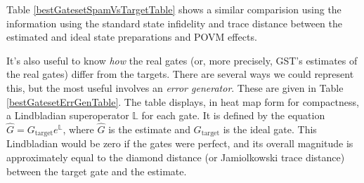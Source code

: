 \documentclass{article}[11pt]
\begin{document}
Table \ref{bestGatesetSpamVsTargetTable} shows a similar comparision using the information using the standard state infidelity and trace distance between the estimated and ideal state preparations and POVM effects.

It's also useful to know \emph{how} the real gates (or, more precisely, GST's estimates of the real gates) differ from the targets.  There are several ways we could represent this, but the most useful involves an \emph{error generator}.  These are given in Table \ref{bestGatesetErrGenTable}.  The table displays, in heat map form for compactness, a Lindbladian superoperator $\mathbb{L}$ for each gate.  It is defined by the equation $\hat{G} = G_{\mathrm{target}}e^{\mathbb{L}}$, where $\hat{G}$ is the estimate and $G_{\mathrm{target}}$ is the ideal gate.  This Lindbladian would be zero if the gates were perfect, and its overall magnitude is approximately equal to the diamond distance (or Jamiolkowski trace distance) between the target gate and the estimate.
\end{document}
